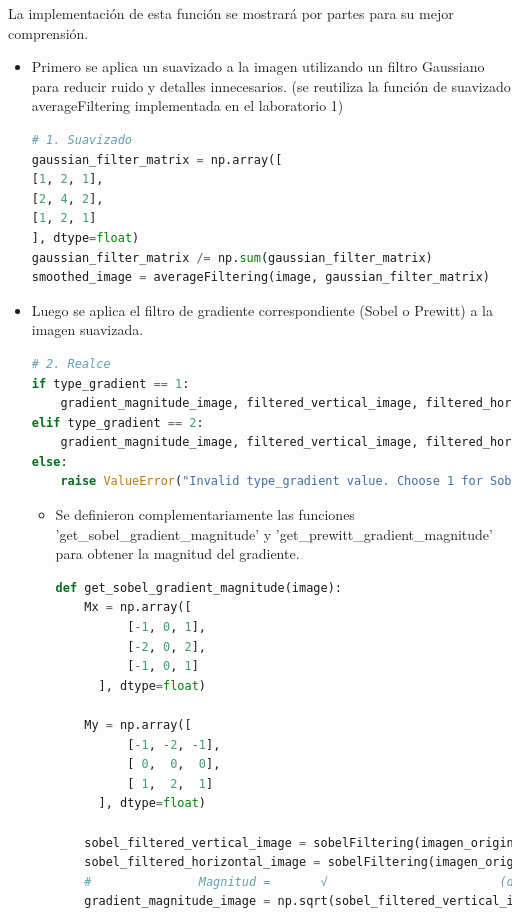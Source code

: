 \documentclass{article}
\begin{document}
    La implementación de esta función se mostrará por partes para su mejor comprensión.
    \begin{itemize}
        \item
        Primero se aplica un suavizado a la imagen utilizando un filtro Gaussiano para reducir ruido y detalles innecesarios.
        (se reutiliza la función de suavizado averageFiltering implementada en el laboratorio 1)
        \begin{lstlisting}[language=Python, caption={Implementación edgeDetector - Suavisado},label={lst:edgeDetector1}]
# 1. Suavizado
gaussian_filter_matrix = np.array([
[1, 2, 1],
[2, 4, 2],
[1, 2, 1]
], dtype=float)
gaussian_filter_matrix /= np.sum(gaussian_filter_matrix)
smoothed_image = averageFiltering(image, gaussian_filter_matrix)
        \end{lstlisting}
        \item
        Luego se aplica el filtro de gradiente correspondiente (Sobel o Prewitt) a la imagen suavizada.
        \begin{lstlisting}[language=Python, caption={Implementación edgeDetector - Gradiente},label={lst:edgeDetector2}]
# 2. Realce
if type_gradient == 1:
    gradient_magnitude_image, filtered_vertical_image, filtered_horizontal_image = get_sobel_gradient_magnitude(smoothed_image)
elif type_gradient == 2:
    gradient_magnitude_image, filtered_vertical_image, filtered_horizontal_image = get_prewitt_gradient_magnitude(smoothed_image)
else:
    raise ValueError("Invalid type_gradient value. Choose 1 for Sobel or 2 for Prewitt.")
        \end{lstlisting}
        \begin{itemize}
            \item Se definieron complementariamente las funciones 'get\_sobel\_gradient\_magnitude' y
            \newline 'get\_prewitt\_gradient\_magnitude' para obtener la magnitud del gradiente.
            \begin{lstlisting}[language=Python, caption={Implementación get\_sobel\_gradient\_magnitude},label={lst:getSobelGradientMagnitude}]
def get_sobel_gradient_magnitude(image):
    Mx = np.array([
          [-1, 0, 1],
          [-2, 0, 2],
          [-1, 0, 1]
      ], dtype=float)

    My = np.array([
          [-1, -2, -1],
          [ 0,  0,  0],
          [ 1,  2,  1]
      ], dtype=float)

    sobel_filtered_vertical_image = sobelFiltering(imagen_original, Mx)
    sobel_filtered_horizontal_image = sobelFiltering(imagen_original, My)
    #               Magnitud =       √                        (df/dx)^2 + (df/dy)^2
    gradient_magnitude_image = np.sqrt(sobel_filtered_vertical_image**2 + sobel_filtered_horizontal_image**2)


\end{lstlisting}
\end{itemize}
\end{itemize}
\end{document}
